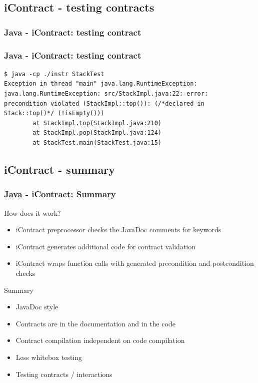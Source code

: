 \documentclass{beamer}
\begin{document}
\subsection{iContract - testing contracts}
\begin{frame}
\frametitle{Java - iContract: testing contract}

\end{frame}

\begin{frame}[fragile]
\frametitle{Java - iContract: testing contract}

\pause
\begin{lstlisting}[basicstyle=\ttfamily\tiny]
$ java -cp ./instr StackTest
Exception in thread "main" java.lang.RuntimeException:
java.lang.RuntimeException: src/StackImpl.java:22: error:
precondition violated (StackImpl::top()): (/*declared in Stack::top()*/ (!isEmpty()))
        at StackImpl.top(StackImpl.java:210)
        at StackImpl.pop(StackImpl.java:124)
        at StackTest.main(StackTest.java:15)
\end{lstlisting}
\end{frame}

\subsection{iContract - summary}
\begin{frame}
\frametitle{Java - iContract: Summary}
\begin{block}{How does it work?}
\begin{itemize}[<+->]
  \item iContract preprocessor checks the JavaDoc comments for keywords
  \item iContract generates additional code for contract validation
  \item iContract wraps function calls with generated precondition and postcondition checks
\end{itemize}
\end{block}
\pause
\begin{block}{Summary}
\begin{itemize}[<+->]
  \item JavaDoc style
  \item Contracts are in the documentation and in the code
  \item Contract compilation independent on code compilation
  \item Less whitebox testing
  \item Testing contracts / interactions
\end{itemize}
\end{block}
\end{frame}
\end{document}

